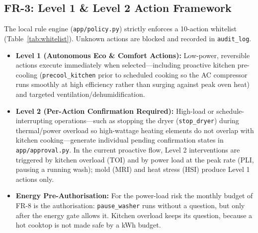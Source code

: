 \documentclass[conference]{IEEEtran}
\begin{document}
\subsection{FR-3: Level 1 \& Level 2 Action Framework}
The local rule engine (\texttt{app/policy.py}) strictly enforces a 10-action whitelist (Table~\ref{tab:whitelist}). Unknown actions are blocked and recorded in \texttt{audit\_log}.
\begin{itemize}
    \item \textbf{Level 1 (Autonomous Eco \& Comfort Actions):} Low-power, reversible actions execute immediately when selected---including proactive kitchen pre-cooling (\texttt{precool\_kitchen} prior to scheduled cooking so the AC compressor runs smoothly at high efficiency rather than surging against peak oven heat) and targeted ventilation/dehumidification.
    \item \textbf{Level 2 (Per-Action Confirmation Required):} High-load or schedule-interrupting operations---such as stopping the dryer (\texttt{stop\_dryer}) during thermal/power overload so high-wattage heating elements do not overlap with kitchen cooking---generate individual pending confirmation states in \texttt{app/approval.py}. In the current proactive flow, Level 2 interventions are triggered by kitchen overload (TOI) and by power load at the peak rate (PLI, pausing a running wash); mold (MRI) and heat stress (HSI) produce Level 1 actions only.
    \item \textbf{Energy Pre-Authorisation:} For the power-load risk the monthly budget of FR-8 is the authorisation: \texttt{pause\_washer} runs without a question, but only after the energy gate allows it. Kitchen overload keeps its question, because a hot cooktop is not made safe by a kWh budget.
\end{itemize}
\end{document}
